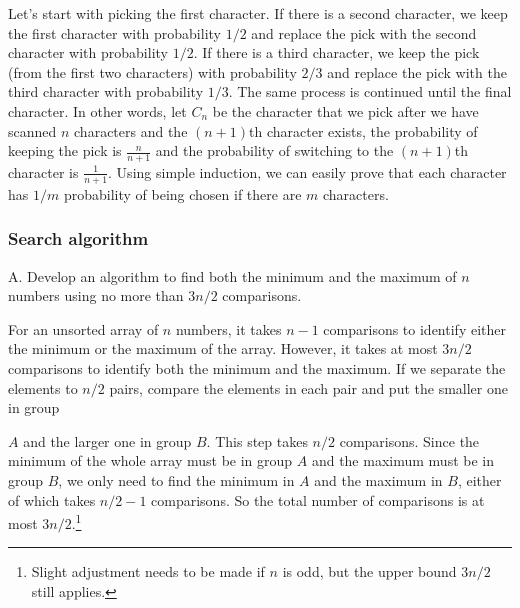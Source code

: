 \begin{solution}
Let's start with picking the first character. If there is a second character, we keep the
first character with probability $1/2$ and replace the pick with the second character with
probability $1/2$. If there is a third character, we keep the pick (from the first two
characters) with probability $2/3$ and replace the pick with the third character with
probability $1/3$. The same process is continued until the final character. In other words,
let $C_n$ be the character that we pick after we have scanned $n$ characters and the $(n+1)$th
character exists, the probability of keeping the pick is $\frac{n}{n+1}$ and the probability
of switching to the $(n+1)$th character is $\frac{1}{n+1}$. Using simple induction, we can
easily prove that each character has $1/m$ probability of being chosen if there are $m$
characters.\qedhere

\end{solution}

\subsubsection*{Search algorithm}

\begin{problem}{A. Develop an algorithm to find both the minimum and the maximum of $n$ numbers using no more than $3n/2$ comparisons.}
\end{problem}

\begin{solution}
For an unsorted array of $n$ numbers, it takes $n-1$ comparisons to identify either the
minimum or the maximum of the array. However, it takes at most $3n/2$ comparisons to
identify both the minimum and the maximum. If we separate the elements to $n/2$ pairs,
compare the elements in each pair and put the smaller one in group


$A$ and the larger one in group $B$. This step takes $n/2$ comparisons. Since the minimum
of the whole array must be in group $A$ and the maximum must be in group $B$, we only need
to find the minimum in $A$ and the maximum in $B$, either of which takes $n/2-1$
comparisons. So the total number of comparisons is at most $3n/2$.\footnote[5]{Slight adjustment needs to be made if $n$ is odd, but the upper bound $3n/2$ still applies.}

\end{solution}

